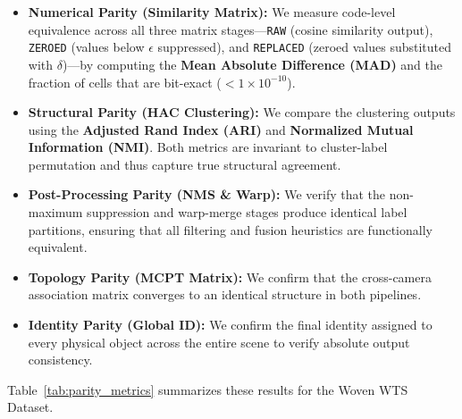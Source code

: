 \documentclass[review]{elsarticle}
\begin{document}
\begin{itemize}[leftmargin=*]
    \item \textbf{Numerical Parity (Similarity Matrix):} We measure code-level equivalence across all three matrix stages---\texttt{RAW} (cosine similarity output), \texttt{ZEROED} (values below $\epsilon$ suppressed), and \texttt{REPLACED} (zeroed values substituted with $\delta$)---by computing the \textbf{Mean Absolute Difference (MAD)} and the fraction of cells that are bit-exact ($< 1 \times 10^{-10}$).
    \item \textbf{Structural Parity (HAC Clustering):} We compare the clustering outputs using the \textbf{Adjusted Rand Index (ARI)} and \textbf{Normalized Mutual Information (NMI)}. Both metrics are invariant to cluster-label permutation and thus capture true structural agreement.
    \item \textbf{Post-Processing Parity (NMS \& Warp):} We verify that the non-maximum suppression and warp-merge stages produce identical label partitions, ensuring that all filtering and fusion heuristics are functionally equivalent.
    \item \textbf{Topology Parity (MCPT Matrix):} We confirm that the cross-camera association matrix converges to an identical structure in both pipelines.
    \item \textbf{Identity Parity (Global ID):} We confirm the final identity assigned to every physical object across the entire scene to verify absolute output consistency.
\end{itemize}

Table~\ref{tab:parity_metrics} summarizes these results for the Woven WTS Dataset.
\end{document}

